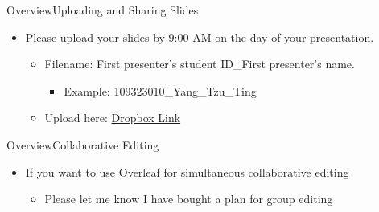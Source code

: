 \documentclass[hyperref={pdfpagelabels=false}]{beamer}
\begin{document}
\begin{frame}{Overview}{Uploading and Sharing Slides}
	\begin{itemize}
		\item Please upload your slides by 9:00 AM on the day of your presentation.
											\vspace{0.2cm}
		\begin{itemize}
			\item Filename: First presenter's student ID\_First presenter's name.
												\vspace{0.2cm}
			\begin{itemize}
				\item Example: 109323010\_Yang\_Tzu\_Ting
													\vspace{0.2cm}
			\end{itemize}
			\item Upload here: 
            \href{https://www.dropbox.com/request/vE8QChJE7x3Ww9kQPuJ8}{Dropbox Link}
		\end{itemize}
														\vspace{0.2cm}
	
	\end{itemize}
\end{frame}



\begin{frame}{Overview}{Collaborative Editing}
	\begin{itemize}
		
		\item If you want to use Overleaf for simultaneous collaborative editing
		
		\begin{itemize}
			\vspace{0.2cm}
			\item Please let me know I have bought a plan for group editing
		\end{itemize}
	\end{itemize}
\end{frame}
\end{document}
